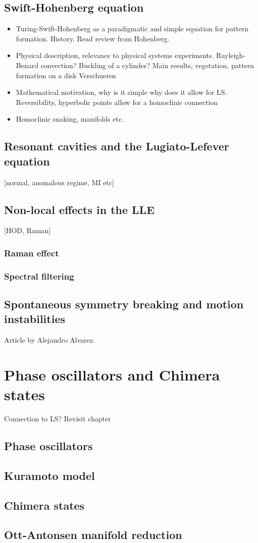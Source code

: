 \subsection{Swift-Hohenberg equation}

\begin{itemize}
    \item Turing-Swift-Hohenberg as a paradigmatic and simple equation for pattern
formation. History. Read review from Hohenberg.
    \item Physical description, relevance to physical systems experiments. 
    Rayleigh-Benard convection? Buckling of a cylinder? Main results, vegetation,
    pattern formation on a disk Verschueren
    \item Mathematical motivation, why is it simple why does it allow for LS.
Reversibility, hyperbolic points allow for a homoclinic connection
    \item Homoclinic snaking, manifolds etc.
\end{itemize}

\subsection{Resonant cavities and the Lugiato-Lefever equation}
[normal, anomalous regime, MI etc]

\subsection{Non-local effects in the LLE}
[HOD, Raman]

\subsubsection{Raman effect}
\subsubsection{Spectral filtering}

\subsection{Spontaneous symmetry breaking and motion instabilities}
Article by Alejandro Alvarez.

\section{Phase oscillators and Chimera states}
Connection to LS?  Revisit chapter
\subsection{Phase oscillators}
\label{sec:phase_oscillators}

\subsection{Kuramoto model}

\subsection{Chimera states}

\subsection{Ott-Antonsen manifold reduction}